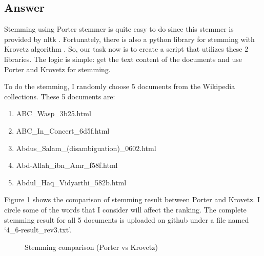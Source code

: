 \documentclass[letterpaper,11pt]{article}
\begin{document}
\subsection*{Answer}
Stemming using Porter stemmer is quite easy to do since this stemmer is provided by nltk \cite{nltk-porter}. Fortunately, there is also a python library for stemming with Krovetz algorithm \cite{krovetz-python}. So, our task now is to create a script that utilizes these 2 libraries. The logic is simple: get the text content of the documents and use Porter and Krovetz for stemming. 

To do the stemming, I randomly choose 5 documents from the Wikipedia collections. These 5 documents are:
\begin{enumerate}
\item ABC\_Wasp\_3b25.html
\item ABC\_In\_Concert\_6d5f.html
\item Abdus\_Salam\_(disambiguation)\_0602.html
\item Abd-Allah\_ibn\_Amr\_f58f.html
\item Abdul\_Haq\_Vidyarthi\_582b.html
\end{enumerate}

Figure \ref{fig:4_6_stemming_comparison} shows the comparison of stemming result between Porter and Krovetz. I circle some of the words that I consider will affect the ranking. The complete stemming result for all 5 documents is uploaded on github under a file named `4\_6-result\_rev3.txt'. 

\begin{figure}[H]
	\centering
	\caption{Stemming comparison (Porter vs Krovetz)}
	\label{fig:4_6_stemming_comparison}
\end{figure}
\end{document}

